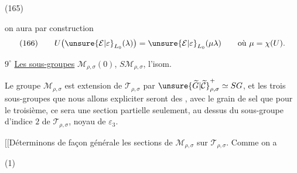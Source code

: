 \noindent (165)\quad
{}

on aura par  construction
\[
\text{(166)}\qquad
U\bigl(\unsure{\mathcal E|\varepsilon}_{L_0}(\lambda)\bigr)
=\unsure{\mathcal E|\varepsilon}_{L_0}(\mu\lambda)
\qquad\text{où }\mu=\chi(U).
\]




 \textcircled{$9^\circ$} \uline{Les sous-groupes}
$\mathcal M_{\rho,\sigma}(0)$,
$S\mathcal M_{\rho,\sigma}$, l'isom.

Le groupe $\mathcal M_{\rho,\sigma}$ est extension de $\mathcal T_{\rho,\sigma}$ par
$\unsure{\widetilde G|\widetilde{\mathcal C}}^+_{\rho,\sigma}\simeq SG$, et les trois sous-groupes que nous allons
expliciter seront des ,  avec le
grain de sel que pour le troisième, ce sera une
section partielle seulement, au dessus du
sous-groupe  d'indice $2$ de $\mathcal T_{\rho,\sigma}$, noyau de
$\varepsilon_3$.

$[\![$Déterminons de façon générale les sections
de $\mathcal M_{\rho,\sigma}$ sur $\mathcal T_{\rho,\sigma}$. Comme on a

\noindent (1)\quad
{}

